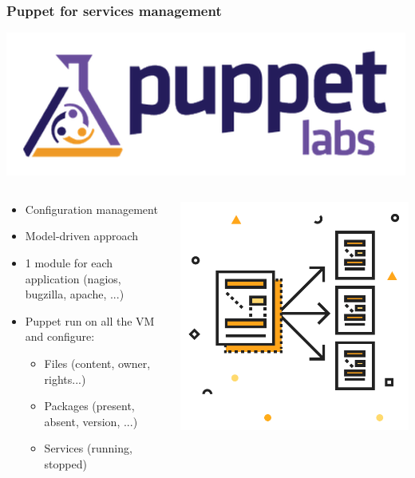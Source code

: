 \documentclass[11pt,compress,final]{beamer}
\begin{document}
\begin{frame}
\frametitle{Puppet for services management}
\begin{center}
\includegraphics[scale=0.2]{figures/puppet}
\end{center}
\begin{columns}
\begin{column}{8cm}
\begin{itemize}
\item Configuration management
\item Model-driven approach
\item 1 module for each application (nagios, bugzilla, apache, ...)
\item Puppet run on all the VM and configure:
\begin{itemize}
\item Files (content, owner, rights...)
\item Packages (present, absent, version, ...)
\item Services (running, stopped)
\end{itemize}
\end{itemize}
\end{column}
\begin{column}{3cm}
\includegraphics[scale=0.15]{figures/puppet_config}
\end{column}
\end{columns}
\end{frame}
\end{document}
